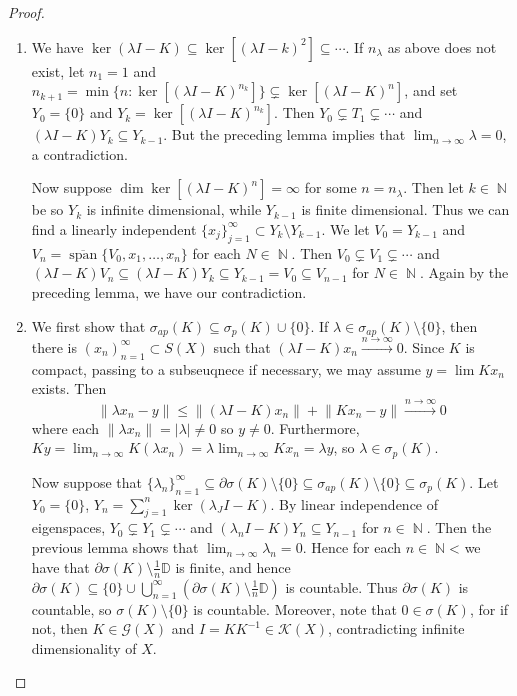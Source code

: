 \documentclass[11pt, a4paper]{memoir}
\DeclareMathOperator{\N}{{\mathbb{N}}}
\newcommand{\norm}[1]{\ensuremath{\left\lVert#1\right\rVert}}
\newcommand{\fto}[1]{\ensuremath{\xrightarrow{\scriptstyle{#1}}}}
\theoremstyle{change}
\theoremstyle{plain}
\theoremstyle{nonumberplain}
\newtheorem{proof}{Proof}
\DeclareMathOperator{\spn}{span}
\numberwithin{equation}{section}
\begin{document}
\begin{proof}
    \begin{enumerate}[nl,r]
        \item We have $\ker(\lambda I-K)\subseteq\ker[(\lambda I-k)^2]\subseteq\cdots$.
            If $n_\lambda$ as above does not exist, let $n_1=1$ and $n_{k+1}=\min\{n:\ker[(\lambda I-K)^{n_k}]\}\subsetneq\ker[(\lambda I-K)^n]$, and set $Y_0=\{0\}$ and $Y_k=\ker[(\lambda I-K)^{n_k}]$.
            Then $Y_0\subsetneq T_1\subsetneq\cdots$ and $(\lambda I-K)Y_k\subseteq Y_{k-1}$.
            But the preceding lemma implies that $\lim_{n\to\infty}\lambda =0$, a contradiction.

            Now suppose $\dim\ker[(\lambda I-K)^n]=\infty$ for some $n=n_\lambda$.
            Then let $k\in\N$ be so $Y_k$ is infinite dimensional, while $Y_{k-1}$ is finite dimensional.
            Thus we can find a linearly independent $\{x_j\}_{j=1}^\infty\subset Y_k\setminus Y_{k-1}$.
            We let $V_0=Y_{k-1}$ and $V_n=\overline{\spn}\{V_0,x_1,\ldots,x_n\}$ for each $N\in\N$.
            Then $V_0\subsetneq V_1\subsetneq\cdots$ and $(\lambda I-K)V_n\subseteq(\lambda I-K)Y_k\subseteq Y_{k-1}=V_0\subseteq V_{n-1}$ for $N\in\N$.
            Again by the preceding lemma, we have our contradiction.
        \item We first show that $\sigma_{ap}(K)\subseteq\sigma_p(K)\cup\{0\}$.
            If $\lambda\in\sigma_{ap}(K)\setminus\{0\}$, then there is $(x_n)_{n=1}^\infty\subset S(X)$ such that $(\lambda I-K)x_n\fto{n\to\infty}0$.
            Since $K$ is compact, passing to a subseuqnece if necessary, we may assume $y=\lim Kx_n$ exists.
            Then
            \begin{equation*}
                \norm{\lambda x_n-y}\leq\norm{(\lambda I-K)x_n}+\norm{Kx_n-y}\fto{n\to\infty}0
            \end{equation*}
            where each $\norm{\lambda x_n}=|\lambda|\neq 0$ so $y\neq 0$.
            Furthermore, $Ky=\lim_{n\to\infty}K(\lambda x_n)=\lambda\lim_{n\to\infty}Kx_n=\lambda y$, so $\lambda\in\sigma_p(K)$.

            Now suppose that $\{\lambda_n\}_{n=1}^\infty\subseteq\partial\sigma(K)\setminus\{0\}\subseteq\sigma_{ap}(K)\setminus\{0\}\subseteq\sigma_p(K)$.
            Let $Y_0=\{0\}$, $Y_n=\sum_{j=1}^n\ker(\lambda_JI-K)$.
            By linear independence of eigenspaces, $Y_0\subsetneq Y_1\subsetneq\cdots$ and $(\lambda_nI-K)Y_n\subseteq Y_{n-1}$ for $n\in\N$.
            Then the previous lemma shows that $\lim_{n\to\infty}\lambda_n=0$.
            Hence for each $n\in\N$< we have that $\partial\sigma(K)\setminus\frac{1}{n}\mathbb{D}$ is finite, and hence $\partial\sigma(K)\subseteq\{0\}\cup\bigcup_{n=1}^\infty(\partial\sigma(K)\setminus\frac{1}{n}\mathbb{D})$ is countable.
            Thus $\partial \sigma(K)$ is countable, so $\sigma(K)\setminus\{0\}$ is countable.
            Moreover, note that $0\in\sigma(K)$, for if not, then $K\in\mathcal{G}(X)$ and $I=KK^{-1}\in\mathcal{K}(X)$, contradicting infinite dimensionality of $X$.
    \end{enumerate}
\end{proof}
\end{document}
